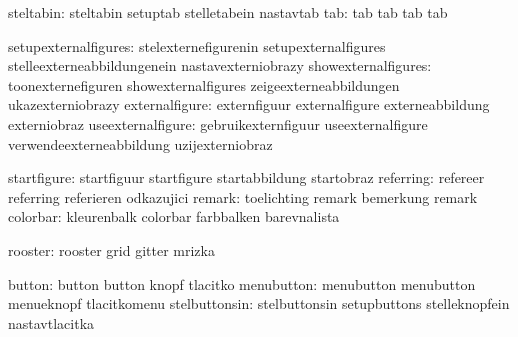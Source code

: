                     steltabin:  steltabin                    setuptab
                                stelletabein                 nastavtab
                          tab:  tab                          tab
                                tab                          tab

         setupexternalfigures:  stelexternefigurenin         setupexternalfigures
                                stelleexterneabbildungenein  nastavexterniobrazy
          showexternalfigures:  toonexternefiguren           showexternalfigures
                                zeigeexterneabbildungen      ukazexterniobrazy
               externalfigure:  externfiguur                 externalfigure
                                externeabbildung             externiobraz
            useexternalfigure:  gebruikexternfiguur          useexternalfigure
                                verwendeexterneabbildung     uzijexterniobraz

                  startfigure:  startfiguur                  startfigure
                                startabbildung               startobraz
                    referring:  refereer                     referring
                                referieren                   odkazujici
                       remark:  toelichting                  remark
                                bemerkung                    remark %
                     colorbar:  kleurenbalk                  colorbar
                                farbbalken                   barevnalista

                      rooster:  rooster                      grid
                                gitter                       mrizka

                       button:  button                       button
                                knopf                        tlacitko
                   menubutton:  menubutton                   menubutton
                                menueknopf                   tlacitkomenu
                stelbuttonsin:  stelbuttonsin                setupbuttons
                                stelleknopfein               nastavtlacitka

